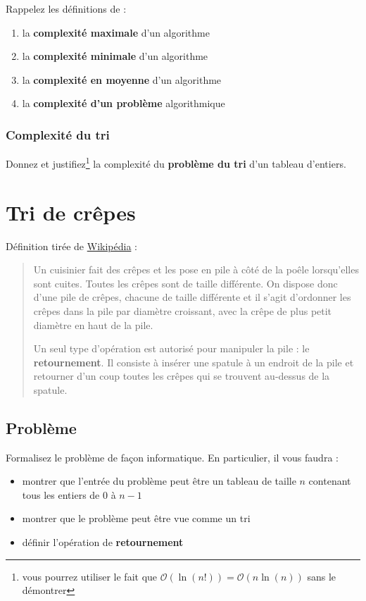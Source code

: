 \documentclass
[12pt]
{article}
\begin{document}
Rappelez les définitions de :

\begin{enumerate}
    \item la {\bf complexité maximale} d'un algorithme
    \item la {\bf complexité minimale} d'un algorithme
    \item la {\bf complexité en moyenne} d'un algorithme
    \item la {\bf complexité d'un problème} algorithmique
\end{enumerate}

\subsubsection{Complexité du tri}

Donnez et justifiez\footnote{vous pourrez utiliser le fait que $\mathcal{O}(\ln(n!)) = \mathcal{O}(n\ln(n))$ sans le démontrer} la complexité du {\bf problème du tri} d'un tableau d'entiers.


\section{Tri de crêpes}

Définition tirée de \href{https://fr.wikipedia.org/wiki/Tri_de_cr%C3%AApes#Contexte}{Wikipédia} :

\begin{verse}
Un cuisinier fait des crêpes et les pose en pile à côté de la poêle lorsqu'elles sont cuites. Toutes les crêpes sont de taille différente. On dispose donc d'une pile de crêpes, chacune de taille différente et il s'agit d'ordonner les crêpes dans la pile par diamètre croissant, avec la crêpe de plus petit diamètre en haut de la pile.

Un seul type d'opération est autorisé pour manipuler la pile : le {\bf retournement}. Il consiste à insérer une spatule à un endroit de la pile et retourner d'un coup toutes les crêpes qui se trouvent au-dessus de la spatule.   
\end{verse}

\subsection{Problème}

Formalisez le problème de façon informatique. En particulier, il vous faudra :

\begin{itemize}
    \item montrer que l'entrée du problème peut être un tableau de taille $n$ contenant tous les entiers de $0$ à $n-1$
    \item montrer que le problème peut être vue comme un tri
    \item définir l'opération de {\bf retournement}
\end{itemize}
\end{document}
